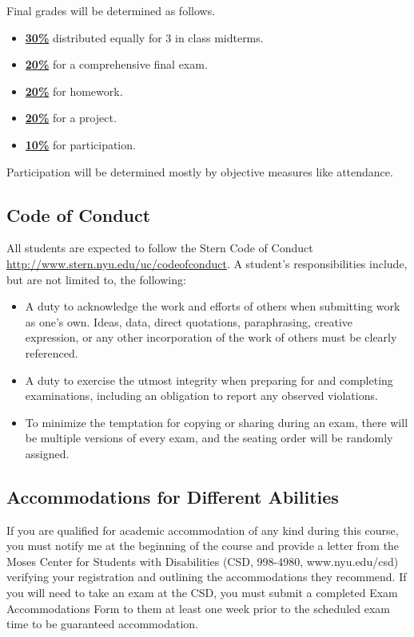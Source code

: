 \documentclass[11pt]{article}
\begin{document}
Final grades will be determined as follows.
\begin{itemize}
    \item \underline{\textbf{30\%}} distributed equally for 3 in class midterms. 
    \item \underline{\textbf{20\%}} for a comprehensive final exam.
    \item \underline{\textbf{20\%}} for homework.
    \item \underline{\textbf{20\%}} for a project.
    \item \underline{\textbf{10\%}} for participation.
\end{itemize}

Participation will be determined mostly by objective measures like attendance. 

\subsection*{Code of Conduct}

All students are expected to follow the Stern Code of Conduct \url{http://www.stern.nyu.edu/uc/codeofconduct}. A student's responsibilities include, but are not limited to, the following:
\begin{itemize}
\item A duty to acknowledge the work and efforts of others when submitting work as one's own.
Ideas, data, direct quotations, paraphrasing, creative expression, or any other incorporation
of the work of others must be clearly referenced.
\item A duty to exercise the utmost integrity when preparing for and completing examinations, including an obligation to report any observed violations.
\item To minimize the temptation for copying or sharing during an exam, there will be multiple versions of every exam, and the seating order will be randomly assigned.
\end{itemize}

\subsection*{Accommodations for Different Abilities}
If you are qualified for academic accommodation of any kind during this course, you must notify me at the beginning of the course and provide a letter from the Moses Center for Students with Disabilities (CSD, 998-4980, www.nyu.edu/csd) verifying your registration and outlining the accommodations they recommend.  If you will need to take an exam at the CSD, you must submit a completed Exam Accommodations Form to them at least one week prior to the scheduled exam time to be guaranteed accommodation.
\end{document}
